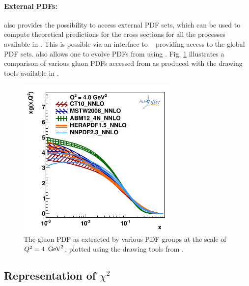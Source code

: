 \paragraph{External PDFs:} \rm 
 \fitter also provides the possibility to access external PDF sets, which can be used to compute 
theoretical predictions for the cross sections for all the processes available in \fitter. 
This is possible via an interface to \lhapdf~\cite{lhapdf,lhapdfweb} providing access to the 
global PDF sets.
\fitter also allows one to evolve PDFs from \lhapdf using \qcdnum.
Fig. \ref{fig:pdfs} illustrates a comparison of various gluon PDFs accessed from \lhapdf as produced with the drawing 
tools available in \fitter.
%
\begin{figure}[!ht]
   \centering
   \includegraphics[width=8cm]{pdfs.pdf}
   \caption{The gluon PDF as extracted by various PDF groups at the scale of $Q^2=4 \ \,\text{Ge\hspace{-.08em}V}^2$, plotted using the drawing tools from \fitter.} 
 \label{fig:pdfs}
\end{figure}
%
\subsection{Representation of \texorpdfstring{$\chi^2$}{χ²}}
\label{sec:chi2representation}

